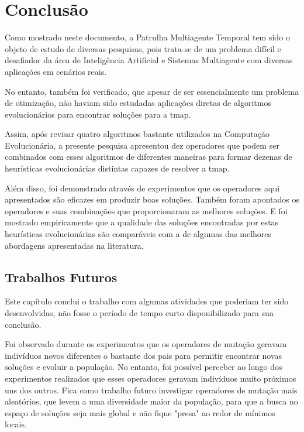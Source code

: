 \chapter{Conclusão}

Como mostrado neste documento, a Patrulha Multiagente Temporal tem sido o objeto 
de estudo de diversas pesquisas, pois trata-se de um problema difícil e 
desafiador da área de Inteligência Artificial e Sistemas Multiagente com 
diversas aplicações em cenários reais.

No entanto, também foi verificado, que apesar de ser essencialmente um problema 
de otimização, não haviam sido estudadas aplicações diretas de algoritmos 
evolucionários para encontrar soluções para a \ac{tmap}.

Assim, após revisar quatro algoritmos bastante utilizados na Computação 
Evolucionária, a presente pesquisa apresentou dez operadores que podem ser 
combinados com esses algoritmos de diferentes maneiras para formar dezenas de 
heurísticas evolucionárias distintas capazes de resolver a \ac{tmap}.

Além disso, foi demonstrado através de experimentos que os operadores aqui 
apresentados são eficazes em produzir boas soluções. Também foram apontados 
os operadores e suas combinações que proporcionaram as melhores soluções. 
E foi mostrado empiricamente que a qualidade das soluções encontradas por estas 
heurísticas evolucionárias são comparáveis com a de algumas das melhores 
abordagens apresentadas na literatura.

\section{Trabalhos Futuros}

Este capítulo conclui o trabalho com algumas atividades que poderiam ter sido 
desenvolvidas, não fosse o período de tempo curto disponibilizado para sua 
conclusão.

Foi observado durante os experimentos que os operadores de mutação geravam 
indivíduos novos diferentes o bastante dos pais para permitir encontrar novas 
soluções e evoluir a população. No entanto, foi possível perceber ao longo dos 
experimentos realizados que esses operadores geravam indivíduos muito próximos 
uns dos outros. Fica como trabalho futuro investigar operadores de mutação mais 
aleatórios, que levem a uma diversidade maior da população, para que a busca no 
espaço de soluções seja mais global e não fique "presa" ao redor de mínimos 
locais.


